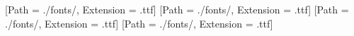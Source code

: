 








[Path = ./fonts/, Extension = .ttf]
[Path = ./fonts/, Extension = .ttf]
[Path = ./fonts/, Extension = .ttf]
\newCJKfontfamily{}[Path = ./fonts/, Extension = .ttf]




\setlength{\parindent}{2em} %
\setlength{\parskip}{0pt}   %

\usepackage{epigraph} 


\makeatletter
\renewcommand{\@makefntext}[1]{\jcz{\@thefnmark.} #1}
\makeatother
\usepackage{enumitem}



\usepackage{amsmath} %
\usepackage{amssymb} %




